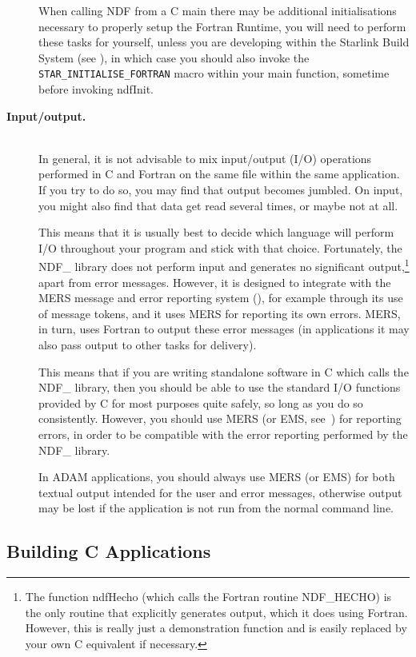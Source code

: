 \documentclass[twoside,11pt,nolof]{starlink}
\begin{document}
\begin{description}
When calling NDF from a C main there may be additional initialisations
necessary to properly setup the Fortran Runtime, you will need to perform
these tasks for yourself, unless you are developing within the Starlink Build
System (see ), in which case you should also invoke the
\texttt{STAR\_INITIALISE\_FORTRAN} macro within your main function, sometime
before invoking ndfInit.

\item[{\bf{Input/output.}}]\mbox{}\\
In general, it is not advisable to mix input/output (I/O) operations
performed in C and Fortran on the same file within the same
application.  If you try to do so, you may find that output becomes
jumbled. On input, you might also find that data get read several
times, or maybe not at all.

This means that it is usually best to decide which language will
perform I/O throughout your program and stick with that
choice. Fortunately, the NDF\_ library does not perform input and
generates no significant output,\footnote{The function ndfHecho (which
calls the Fortran routine NDF\_HECHO) is the only routine that
explicitly generates output, which it does using Fortran. However,
this is really just a demonstration function and is easily replaced by
your own C equivalent if necessary.} apart from error
messages. However, it is designed to integrate with the MERS message
and error reporting system (), for example
through its use of message tokens, and it uses MERS for reporting its
own errors. MERS, in turn, uses Fortran to output these error messages
(in  applications it may also pass output to other
tasks for delivery).

This means that if you are writing standalone software in C which
calls the NDF\_ library, then you should be able to use the standard
I/O functions provided by C for most purposes quite safely, so long as
you do so consistently. However, you should use MERS (or EMS,
see~) for reporting errors, in order to be
compatible with the error reporting performed by the NDF\_ library.

In ADAM applications, you should always use MERS (or EMS) for both
textual output intended for the user and error messages, otherwise
output may be lost if the application is not run from the normal
command line.
\end{description}

\subsection{Building C Applications}
\end{document}
